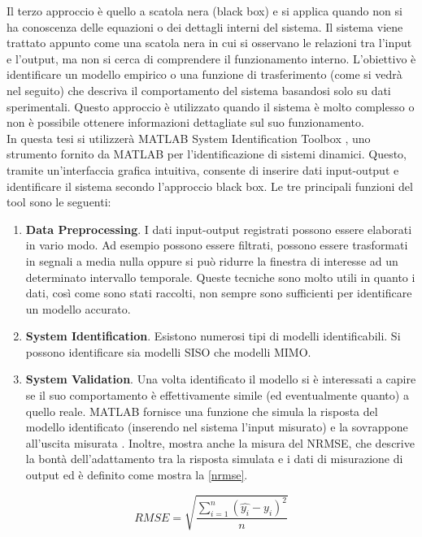 Il terzo approccio è quello a scatola nera (black box) e si applica quando non si ha conoscenza delle equazioni o dei dettagli interni del sistema. Il sistema viene trattato appunto come una scatola nera in cui si osservano le relazioni tra l'input e l'output, ma non si cerca di comprendere il funzionamento interno. L'obiettivo è identificare un modello empirico o una funzione di trasferimento (come si vedrà nel seguito) che descriva il comportamento del sistema basandosi solo su dati sperimentali. Questo approccio è utilizzato quando il sistema è molto complesso o non è possibile ottenere informazioni dettagliate sul suo funzionamento.\\

In questa tesi si utilizzerà MATLAB System Identification Toolbox \cite{sysIdMatArt} \cite{sysID}, uno strumento fornito da MATLAB per l'identificazione di sistemi dinamici. Questo, tramite un'interfaccia grafica intuitiva, consente di inserire dati input-output e identificare il sistema secondo l'approccio black box. Le tre principali funzioni del tool sono le seguenti:
\begin{enumerate}
	\item \textbf{Data Preprocessing}. I dati input-output registrati possono essere elaborati in vario modo. Ad esempio possono essere filtrati, possono essere trasformati in segnali a media nulla oppure si può ridurre la finestra di interesse ad un determinato intervallo temporale. Queste tecniche sono molto utili in quanto i dati, così come sono stati raccolti, non sempre sono sufficienti per identificare un modello accurato.
	\item \textbf{System Identification}. Esistono numerosi tipi di modelli identificabili. Si possono identificare sia modelli \ac{SISO} che modelli \ac{MIMO}.
	\item \textbf{System Validation}. Una volta identificato il modello si è interessati a capire se il suo comportamento è effettivamente simile (ed eventualmente quanto) a quello reale. MATLAB fornisce una funzione che simula la risposta del modello identificato (inserendo nel sistema l'input misurato) e la sovrappone all'uscita misurata \cite{compare}. Inoltre, mostra anche la misura del \ac{NRMSE}, che descrive la bontà dell'adattamento tra la risposta simulata e i dati di misurazione di output ed è definito come mostra la \ref{nrmse}.
\end{enumerate}

\begin{equation}
	RMSE = \sqrt{\frac{\sum_{i=1}^{n} {(\hat{y_i} - y_i)}^2}{n}}
	\label{rmse}
\end{equation}

